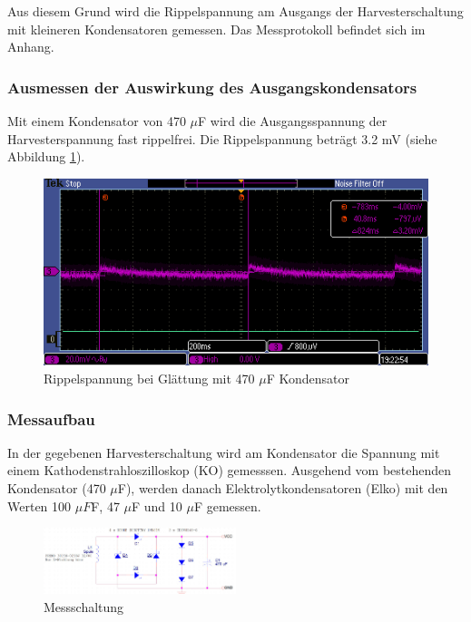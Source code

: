 Aus diesem Grund wird die Rippelspannung am Ausgangs der Harvesterschaltung mit kleineren Kondensatoren gemessen. Das Messprotokoll befindet sich im Anhang.

\subsubsection{Ausmessen der Auswirkung des Ausgangskondensators}

Mit einem Kondensator von 470 $\mu$F wird die Ausgangsspannung der Harvesterspannung fast rippelfrei. Die Rippelspannung beträgt 3.2 mV (siehe Abbildung \ref{kond470uF}).

\begin{figure}[ht]
    \includegraphics[width=15cm]{3Vorgehen/imag/470uF.PNG}
    \caption{Rippelspannung bei Glättung mit 470 $\mu$F Kondensator}\label{kond470uF} 
\end{figure}

\subsubsection*{Messaufbau}
In der gegebenen Harvesterschaltung wird am Kondensator die Spannung mit einem Kathodenstrahloszilloskop (KO) gemesssen. Ausgehend vom bestehenden Kondensator (470 $ \mu $F), werden danach Elektrolytkondensatoren (Elko) mit den Werten 100 $\mu F $F, 47 $\mu$F und 10 $\mu$F gemessen.

\begin{figure}[h7]
    \includegraphics[width=0.5\textwidth]{3Vorgehen/imag/messschaltungHarvesterschaltung.jpg}
    \caption{Messschaltung}
\end{figure}

